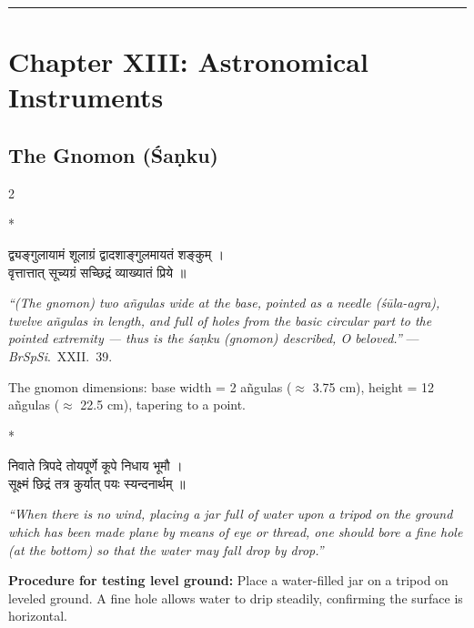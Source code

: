 \documentclass[11pt,a4paper]{article}
\newcommand{\longline}{\noindent\rule{\textwidth}{0.4pt}}
\newcommand{\dev}[1]{{\devanagarifont #1}}
\theoremstyle{definition}
\begin{document}
\longline

\section{Chapter XIII: Astronomical Instruments}
\label{sec:instruments}

\subsection*{The Gnomon (\'{S}a\d{n}ku)}

\begin{paracol}{2}

\switchcolumn[0]*\noindent
\begin{tcolorbox}[colback=sktbg,colframe=vertrule,boxrule=0.5pt,arc=3pt]
\dev{द्व्यङ्गुलायामं शूलाग्रं द्वादशाङ्गुलमायतं शङ्कुम् ।\\
वृत्तात्तात् सूच्यग्रं सच्छिद्रं व्याख्यातं प्रिये ॥}
\end{tcolorbox}

\switchcolumn\noindent
\begin{tcolorbox}[colback=transbg,colframe=vertrule!60,boxrule=0.5pt,arc=3pt]
\textit{``(The gnomon) two a\~ngulas wide at the base, pointed as a needle (\'{s}\=ula-agra), twelve a\~ngulas in length, and full of holes from the basic circular part to the pointed extremity --- thus is the \'{s}a\d{n}ku (gnomon) described, O beloved.''} --- \textit{BrSpSi}.\ XXII.\ 39.

The gnomon dimensions: base width = 2 a\~ngulas ($\approx$ 3.75 cm), height = 12 a\~ngulas ($\approx$ 22.5 cm), tapering to a point.
\end{tcolorbox}

\switchcolumn[0]*\noindent
\begin{tcolorbox}[colback=sktbg,colframe=vertrule,boxrule=0.5pt,arc=3pt]
\dev{निवाते त्रिपदे तोयपूर्णे कूपे निधाय भूमौ ।\\
सूक्ष्मं छिद्रं तत्र कुर्यात् पयः स्यन्दनार्थम् ॥}
\end{tcolorbox}

\switchcolumn\noindent
\begin{tcolorbox}[colback=transbg,colframe=vertrule!60,boxrule=0.5pt,arc=3pt]
\textit{``When there is no wind, placing a jar full of water upon a tripod on the ground which has been made plane by means of eye or thread, one should bore a fine hole (at the bottom) so that the water may fall drop by drop.''}

\textbf{Procedure for testing level ground:} Place a water-filled jar on a tripod on leveled ground. A fine hole allows water to drip steadily, confirming the surface is horizontal.
\end{tcolorbox}

\end{paracol}
\end{document}
